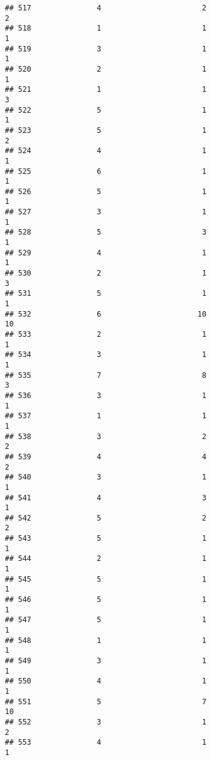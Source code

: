\documentclass[
]{article}
\begin{document}
\begin{verbatim}
## 517               4                       2                        2
## 518               1                       1                        1
## 519               3                       1                        1
## 520               2                       1                        1
## 521               1                       1                        3
## 522               5                       1                        1
## 523               5                       1                        2
## 524               4                       1                        1
## 525               6                       1                        1
## 526               5                       1                        1
## 527               3                       1                        1
## 528               5                       3                        1
## 529               4                       1                        1
## 530               2                       1                        3
## 531               5                       1                        1
## 532               6                      10                       10
## 533               2                       1                        1
## 534               3                       1                        1
## 535               7                       8                        3
## 536               3                       1                        1
## 537               1                       1                        1
## 538               3                       2                        2
## 539               4                       4                        2
## 540               3                       1                        1
## 541               4                       3                        1
## 542               5                       2                        2
## 543               5                       1                        1
## 544               2                       1                        1
## 545               5                       1                        1
## 546               5                       1                        1
## 547               5                       1                        1
## 548               1                       1                        1
## 549               3                       1                        1
## 550               4                       1                        1
## 551               5                       7                       10
## 552               3                       1                        2
## 553               4                       1                        1

\end{verbatim}
\end{document}

